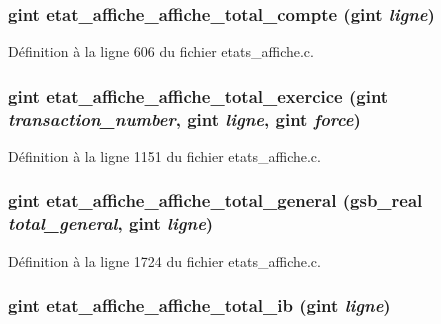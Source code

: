 \subsubsection[{etat\_\-affiche\_\-affiche\_\-total\_\-compte}]{\setlength{\rightskip}{0pt plus 5cm}gint etat\_\-affiche\_\-affiche\_\-total\_\-compte (gint {\em ligne})}\label{etats__affiche_8c_a66a960e46b7ba5b6b3d31b3b3450c343}


Définition à la ligne 606 du fichier etats\_\-affiche.c.

\subsubsection[{etat\_\-affiche\_\-affiche\_\-total\_\-exercice}]{\setlength{\rightskip}{0pt plus 5cm}gint etat\_\-affiche\_\-affiche\_\-total\_\-exercice (gint {\em transaction\_\-number}, \/  gint {\em ligne}, \/  gint {\em force})}\label{etats__affiche_8c_ac945a1899478f32291729b2a3d174cbf}


Définition à la ligne 1151 du fichier etats\_\-affiche.c.

\subsubsection[{etat\_\-affiche\_\-affiche\_\-total\_\-general}]{\setlength{\rightskip}{0pt plus 5cm}gint etat\_\-affiche\_\-affiche\_\-total\_\-general ({\bf gsb\_\-real} {\em total\_\-general}, \/  gint {\em ligne})}\label{etats__affiche_8c_ae7d557c89ed939a2d6c553647a0f2d8e}


Définition à la ligne 1724 du fichier etats\_\-affiche.c.

\subsubsection[{etat\_\-affiche\_\-affiche\_\-total\_\-ib}]{\setlength{\rightskip}{0pt plus 5cm}gint etat\_\-affiche\_\-affiche\_\-total\_\-ib (gint {\em ligne})}\label{etats__affiche_8c_a8efa140053832991d342959e71ea96fe}


